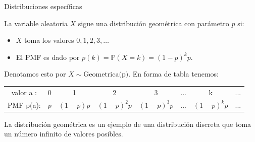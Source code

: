 \documentclass[10pt]{beamer}
\begin{document}
\begin{frame}{Distribuciones espec\'ificas}
\small{La variable aleatoria $X$ sigue una distribuci\'on geom\'etrica con par\'ametro $p$ si:
	
\begin{itemize}
	\item $X$ toma los valores $0,1,2, 3, \dots$
	\item El PMF es dado por $p(k) = \mathbb{P}(X = k) = (1 - p)^kp.$
\end{itemize}

Denotamos esto por $X \sim \text{Geometrica(p)}$. En forma de tabla tenemos:

\begin{table}[]
	\centering
	\begin{tabular}{cccccccc}
		valor a : & 0  & 1 &  2 & 3  & ...& k & ...\\
		PMF p(a): & $p$ & $(1 -p)p$  & $(1 -p)^2p$  & $(1 -p)^3p$  & ...& $(1 -p)^kp$&...   
	\end{tabular}
\end{table}

La distribuci\'on geom\'etrica es un ejemplo de una distribuci\'on discreta que toma un n\'umero infinito de valores posibles.	
}
\end{frame}
\end{document}
